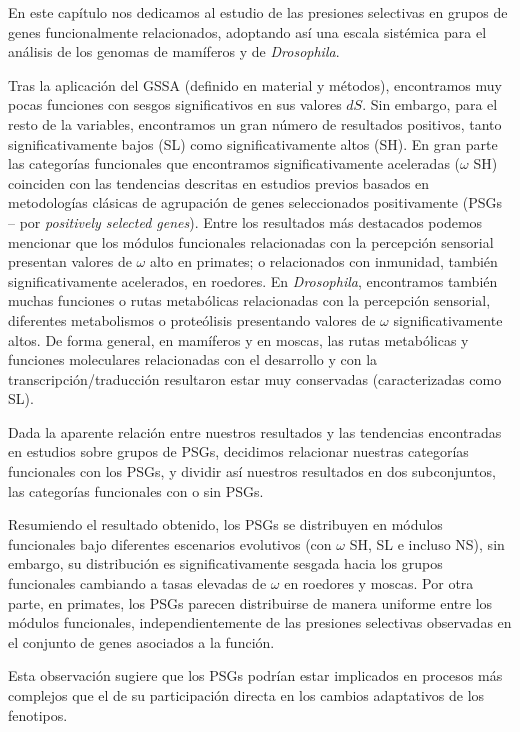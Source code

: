 En este capítulo nos dedicamos al estudio de las presiones selectivas en grupos de genes funcionalmente relacionados, adoptando así una escala sistémica para el análisis de los genomas de mamíferos y de \textit{Drosophila}.

Tras la aplicación del GSSA (definido en material y métodos), encontramos muy pocas funciones con sesgos significativos en sus valores $dS$. Sin embargo, para el resto de la variables, encontramos un gran número de resultados positivos, tanto significativamente bajos (SL) como significativamente altos (SH). En gran parte las categorías funcionales que encontramos significativamente aceleradas ($\omega$ SH) coinciden con las tendencias descritas en estudios previos basados en metodologías clásicas de agrupación de genes seleccionados positivamente (PSGs -- por \textit{positively selected genes}). Entre los resultados más destacados podemos mencionar que los módulos funcionales relacionadas con la percepción sensorial presentan valores de $\omega$ alto en primates; o relacionados con inmunidad, también significativamente acelerados, en roedores. En \textit{Drosophila}, encontramos también muchas funciones o rutas metabólicas relacionadas con la percepción sensorial, diferentes metabolismos o proteólisis presentando valores de $\omega$ significativamente altos. De forma general, en mamíferos y en moscas, las rutas metabólicas y funciones moleculares relacionadas con el desarrollo y con la transcripción/traducción resultaron estar muy conservadas (caracterizadas como SL).

Dada la aparente relación entre nuestros resultados y las tendencias encontradas en estudios sobre grupos de PSGs, decidimos relacionar nuestras categorías funcionales con los PSGs, y dividir así nuestros resultados en dos subconjuntos, las categorías funcionales con o sin PSGs. 

Resumiendo el resultado obtenido, los PSGs se distribuyen en módulos funcionales bajo diferentes escenarios evolutivos (con $\omega$ SH, SL e incluso NS), sin embargo, su distribución es significativamente sesgada hacia los grupos funcionales cambiando a tasas elevadas de $\omega$ en roedores y moscas. Por otra parte, en primates, los PSGs parecen distribuirse de manera uniforme entre los módulos funcionales, independientemente de las presiones selectivas observadas en el conjunto de genes asociados a la función.

Esta observación sugiere que los PSGs podrían estar implicados en procesos más complejos que el de su participación directa en los cambios adaptativos de los fenotipos.

